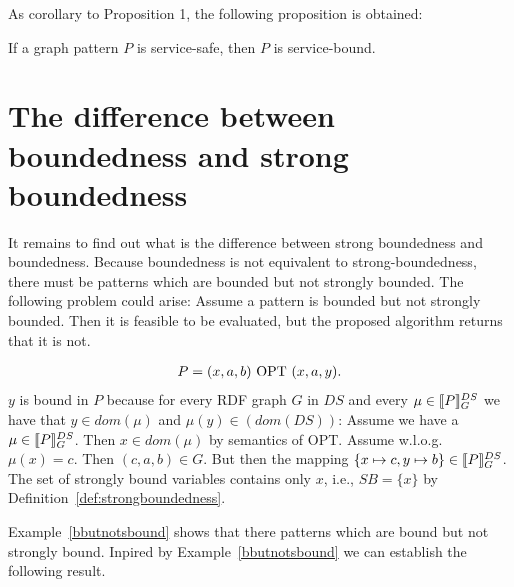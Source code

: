 As corollary to Proposition 1, the following proposition is obtained:
\begin{proposition}
	If a graph pattern $P$ is service-safe, then $P$ is service-bound.
\end{proposition}

\section{The difference between boundedness and strong boundedness}
It remains to find out what is the difference between strong boundedness
and boundedness. Because boundedness is not equivalent to strong-boundedness, there
must be patterns which are bounded but not strongly bounded. The following problem could arise:
Assume a pattern is bounded but not strongly bounded. Then it is feasible to be evaluated, 
but the proposed algorithm returns that it is not.

\begin{example}\label{bbutnotsbound}
	\begin{align*}
		P = (x,a, b) \mbox{ OPT } (x, a, y).
	\end{align*}
	$y$ is bound in $P$ because for every RDF graph $G$ in $DS$ and
	every $\mu \in \llbracket P \rrbracket^{DS}_G$ we have that $y \in dom(\mu)$ and
	$\mu(y) \in (dom(DS))$: Assume we have a $\mu \in \llbracket P \rrbracket^{DS}_G$. Then $x
	\in dom(\mu)$ by semantics of OPT. Assume w.l.o.g. $\mu(x) = c$. Then
	$(c,a, b) \in G$. But then the mapping $\{ x \mapsto c , y\mapsto b \}
	\in \llbracket P \rrbracket^{DS}_G$.
	The set of strongly bound variables contains
	only $x$, i.e., $SB = \{ x \}$ by Definition~\ref{def:strongboundedness}.
\end{example}

Example~\ref{bbutnotsbound} shows that there patterns 
which are bound but not strongly bound. Inpired by Example~\ref{bbutnotsbound}
we can establish the following result.

